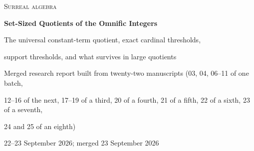 \documentclass[11pt,letterpaper]{article}
\numberwithin{equation}{section}
\theoremstyle{definition}
\theoremstyle{remark}
\theoremstyle{plain}
\newcommand{\Oz}{\mathbf{Oz}}
\newcommand{\Z}{\mathbb Z}
\newcommand{\ct}{\operatorname{ct}}
\begin{document}
\hypersetup{pageanchor=false}
\begin{titlepage}
\centering
\vspace*{0.1in}
{\large\scshape Surreal algebra\par}
\vspace{0.2in}
{\LARGE\bfseries Set-Sized Quotients of the Omnific Integers\par}
\vspace{0.2in}
{\large The universal constant-term quotient, exact cardinal thresholds,\par
support thresholds, and what survives in large quotients\par}
\vspace{0.2in}
{Merged research report built from twenty-two manuscripts (03, 04, 06--11 of one batch,\par
12--16 of the next, 17--19 of a third, 20 of a fourth, 21 of a fifth, 22 of a sixth, 23 of a seventh,\par
24 and 25 of an eighth)\par}
\vspace{0.08in}
{22--23 September 2026; merged 23 September 2026\par}
\vspace{0.2in}
\begin{minipage}{0.9\textwidth}
\begin{abstract}
Write an omnific integer uniquely as $n+s$ with $n\in\Z$ and $s$ purely infinite, and let
$\ct(n+s)=n$. Every additive and multiplicative map from $\Oz$ to a set-sized ring, even
a noncommutative, nonreduced or nonunital one, has the form $x\mapsto\ct(x)e$ with $e$
idempotent; every set-sized $\Oz$-module is an abelian group with scalar action through
$\ct$. The same holds for $D+\Pi_K$ over any set field $K$ and unital $D\subseteq K$, for
the Gaussian ring $\Oz[i]$ (with $\Z[i]$), and, on the finite side, for standard part on
the finite surreal and surcomplex rings. Countable supports already force this
collapse while finite supports do not.


\end{abstract}
\end{minipage}
\end{titlepage}
\end{document}
